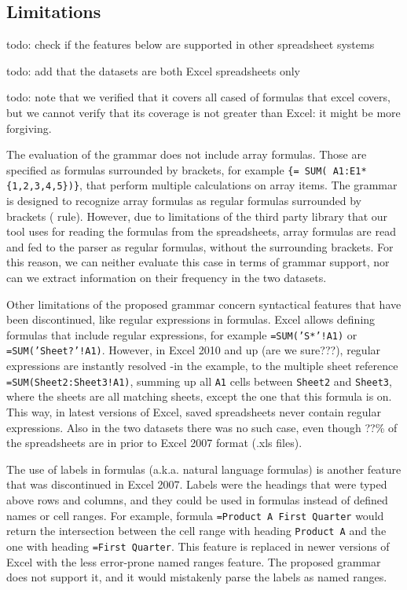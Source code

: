 \documentclass[conference]{IEEEtran}
\begin{document}
\subsection{Limitations}
todo: check if the features below are supported in other spreadsheet systems

todo: add that the datasets are both Excel spreadsheets only

todo: note that we verified that it covers all cased of formulas that excel covers, but we cannot verify that its coverage is not greater than Excel: it might be more forgiving.

The evaluation of the grammar does not include array formulas. Those are specified as formulas surrounded by brackets, for example \texttt{\{= SUM( A1:E1*\{1,2,3,4,5\})\}}, that perform multiple calculations on array items. The grammar is designed to recognize array formulas as regular formulas surrounded by brackets ( rule). However, due to limitations of the third party library that our tool uses for reading the formulas from the spreadsheets, array formulas are read and fed to the parser as regular formulas, without the surrounding brackets. For this reason, we can neither evaluate this case in terms of grammar support, nor can we extract information on their frequency in the two datasets.

Other limitations of the proposed grammar concern syntactical features that have been discontinued, like regular expressions in formulas. Excel allows defining formulas that include regular expressions, for example \texttt{=SUM('S*'!A1)} or \texttt{=SUM('Sheet?'!A1)}. However, in Excel 2010 and up (are we sure???), regular expressions are instantly resolved -in the example, to the multiple sheet reference \texttt{=SUM(Sheet2:Sheet3!A1)}, summing up all \texttt{A1} cells between \texttt{Sheet2} and \texttt{Sheet3}, where the sheets are all matching sheets, except the one that this formula is on. This way, in latest versions of Excel, saved spreadsheets never contain regular expressions. Also in the two datasets there was no such case, even though ??\% of the spreadsheets are in prior to Excel 2007 format (.xls files). 

The use of labels in formulas (a.k.a. natural language formulas) is another feature that was discontinued in Excel 2007. Labels were the headings that were typed above rows and columns, and they could be used in formulas instead of defined names or cell ranges. For example, formula \texttt{=Product A First Quarter} would return the intersection between the cell range with heading \texttt{Product A} and the one with heading \texttt{=First Quarter}. This feature is replaced in newer versions of Excel with the less error-prone named ranges feature. The proposed grammar does not support it, and it would mistakenly parse the labels as named ranges.
\end{document}
